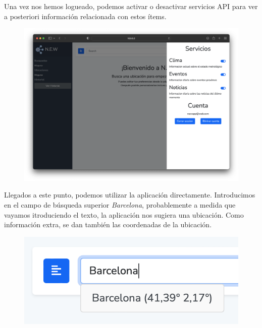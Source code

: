 \documentclass[../ei103948-project-documentation.tex]{subfiles}
\begin{document}
                                Una vez nos hemos logueado, podemos activar o desactivar servicios API para ver a posteriori información relacionada con estos ítems.



                                \begin{figure}[H]
                                    \begin{center}
                                        \hspace*{-5mm}
                                    \includegraphics[scale=0.33]{images/final3.png}
                                    \end{center}
                                \end{figure}

                                Llegados a este punto, podemos utilizar la aplicación directamente. Introducimos en el campo de búsqueda superior \textit{Barcelona}, probablemente a medida que vayamos itroduciendo el texto, la aplicación nos sugiera una ubicación. Como información extra, se dan también las coordenadas de la ubicación.\\


                                \begin{figure}[H]
                                    \begin{center}
                                    \includegraphics[scale=0.50]{images/finaltextoautocompletado.png}
                                    \end{center}
                                \end{figure}
\end{document}
